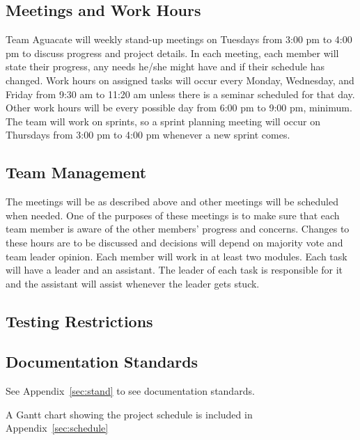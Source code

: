 
\subsection{Meetings and Work Hours}
Team Aguacate will weekly stand-up meetings on Tuesdays from 3:00 pm to 4:00 pm to discuss progress and project details. In each meeting, each member will state their progress, any needs he/she might have and if their schedule has changed. Work hours on assigned tasks will occur every Monday, Wednesday, and Friday from 9:30 am to 11:20 am unless there is a seminar scheduled for that day. Other work hours will be every possible day from 6:00 pm to 9:00 pm, minimum. The team will work on sprints, so a sprint planning meeting will occur on Thursdays from 3:00 pm to 4:00 pm whenever a new sprint comes.

\subsection{Team Management}
The meetings will be as described above and other meetings will be scheduled when needed. One of the purposes of these meetings is to make sure that each team member is aware of the other members' progress and concerns. Changes to these hours are to be discussed and decisions will depend on majority vote and team leader opinion. Each member will work in at least two modules. Each task will have a leader and an assistant. The leader of each task is responsible for it and the assistant will assist whenever the leader gets stuck. 

\subsection{Testing Restrictions}

\subsection{Documentation Standards}
See Appendix~\ref{sec:stand} to see documentation standards.

A Gantt chart showing the project schedule is included in Appendix~\ref{sec:schedule} 